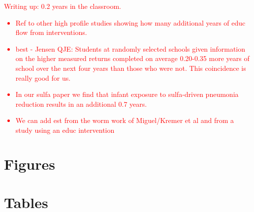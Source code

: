 \documentclass[subeqn]{article}
\newcommand{\twinfolder}{"/home/damian/investigacion/Activa/Twins"}
\begin{document}
\begin{spacing}{1.4}
\textcolor{red}{ Writing up: 0.2 years in the classroom.
\begin{itemize}
\item Ref to other high profile studies showing how many additional years of 
educ flow from interventions.
\item  best - Jensen QJE: Students at randomly selected schools given 
information on the higher measured returns completed on average 0.20-0.35 more 
years of school over the next four years than those who were not. This 
coincidence is really good for us.
\item In our sulfa paper we find that infant exposure to sulfa-driven pneumonia 
reduction results in an additional 0.7 years.
\item We can add est from the worm work of Miguel/Kremer et al and from a study 
using an educ intervention
\end{itemize}
}





\newpage
\section*{Figures}


\clearpage
\section*{Tables}

\clearpage






\begin{landscape}

\end{landscape}




\clearpage




\end{spacing}
\end{document}
